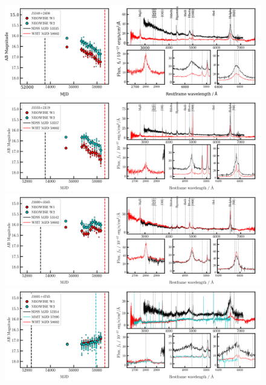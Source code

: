 \documentclass[a4paper,fleqn,usenatbib]{mnras}
\begin{document}
\begin{figure}
  \centering
  \includegraphics[width=16.7cm, trim=0.0cm 0.05cm 0.2cm 0.1cm, clip]
  {../plots/LCs_and_spectra/J1348+2456_landscape_temp.png}
  \includegraphics[width=16.7cm, trim=0.0cm 0.05cm 0.2cm 0.1cm, clip]
  {../plots/LCs_and_spectra/J1555+2119_landscape_temp.png}
  \includegraphics[width=16.7cm, trim=0.0cm 0.0cm  0.2cm 0.1cm, clip]
  {../plots/LCs_and_spectra/J1600+3345_landscape_temp.png}
  \includegraphics[width=16.7cm, trim=0.0cm 0.05cm 0.2cm 0.1cm, clip]
  {../plots/LCs_and_spectra/J1601+4745_landscape_temp.png}
  \vspace{-12pt}
  \caption[]{}
  \label{fig:all_spectra_a}
\end{figure}
\end{document}

